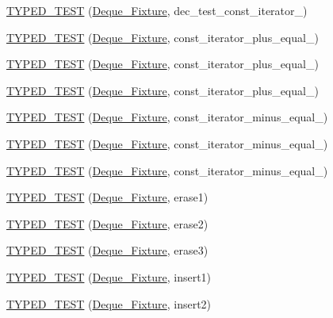 \begin{DoxyCompactItemize}
\hyperlink{TestDeque_8c_09_09_a658cfacace7099cca16cb18c43ac08fe}{T\-Y\-P\-E\-D\-\_\-\-T\-E\-S\-T} (\hyperlink{structDeque__Fixture}{Deque\-\_\-\-Fixture}, dec\-\_\-test\-\_\-const\-\_\-iterator\-\_)
\item 
\hyperlink{TestDeque_8c_09_09_a64c4ba1e33b218f7248e0503d2052995}{T\-Y\-P\-E\-D\-\_\-\-T\-E\-S\-T} (\hyperlink{structDeque__Fixture}{Deque\-\_\-\-Fixture}, const\-\_\-iterator\-\_\-plus\-\_\-equal\-\_)
\item 
\hyperlink{TestDeque_8c_09_09_a3e2aa1da2651f015562b199f90a1fb1e}{T\-Y\-P\-E\-D\-\_\-\-T\-E\-S\-T} (\hyperlink{structDeque__Fixture}{Deque\-\_\-\-Fixture}, const\-\_\-iterator\-\_\-plus\-\_\-equal\-\_)
\item 
\hyperlink{TestDeque_8c_09_09_ab43c0fe733ccae927c0c3cea394ddceb}{T\-Y\-P\-E\-D\-\_\-\-T\-E\-S\-T} (\hyperlink{structDeque__Fixture}{Deque\-\_\-\-Fixture}, const\-\_\-iterator\-\_\-plus\-\_\-equal\-\_)
\item 
\hyperlink{TestDeque_8c_09_09_a3b4d1cd94116a45762c46a0f1201e177}{T\-Y\-P\-E\-D\-\_\-\-T\-E\-S\-T} (\hyperlink{structDeque__Fixture}{Deque\-\_\-\-Fixture}, const\-\_\-iterator\-\_\-minus\-\_\-equal\-\_)
\item 
\hyperlink{TestDeque_8c_09_09_a549e2b635cc5236fc4bb149ac6f3c945}{T\-Y\-P\-E\-D\-\_\-\-T\-E\-S\-T} (\hyperlink{structDeque__Fixture}{Deque\-\_\-\-Fixture}, const\-\_\-iterator\-\_\-minus\-\_\-equal\-\_)
\item 
\hyperlink{TestDeque_8c_09_09_a5c820c69c17a5759e12299ea785c6e38}{T\-Y\-P\-E\-D\-\_\-\-T\-E\-S\-T} (\hyperlink{structDeque__Fixture}{Deque\-\_\-\-Fixture}, const\-\_\-iterator\-\_\-minus\-\_\-equal\-\_)
\item 
\hyperlink{TestDeque_8c_09_09_aa038f11955cae1bf169957db1e393406}{T\-Y\-P\-E\-D\-\_\-\-T\-E\-S\-T} (\hyperlink{structDeque__Fixture}{Deque\-\_\-\-Fixture}, erase1)
\item 
\hyperlink{TestDeque_8c_09_09_affafc6dd2ab8d3e3d920f19e8dfd2f8e}{T\-Y\-P\-E\-D\-\_\-\-T\-E\-S\-T} (\hyperlink{structDeque__Fixture}{Deque\-\_\-\-Fixture}, erase2)
\item 
\hyperlink{TestDeque_8c_09_09_a3fe97f1291ac267dc0b92d75b13ce096}{T\-Y\-P\-E\-D\-\_\-\-T\-E\-S\-T} (\hyperlink{structDeque__Fixture}{Deque\-\_\-\-Fixture}, erase3)
\item 
\hyperlink{TestDeque_8c_09_09_a26c27ef1c10114fd15865ed1927822f1}{T\-Y\-P\-E\-D\-\_\-\-T\-E\-S\-T} (\hyperlink{structDeque__Fixture}{Deque\-\_\-\-Fixture}, insert1)
\item 
\hyperlink{TestDeque_8c_09_09_a676ec9c42ee6abfbc5da61168a2b4a8c}{T\-Y\-P\-E\-D\-\_\-\-T\-E\-S\-T} (\hyperlink{structDeque__Fixture}{Deque\-\_\-\-Fixture}, insert2)

\end{DoxyCompactItemize}
